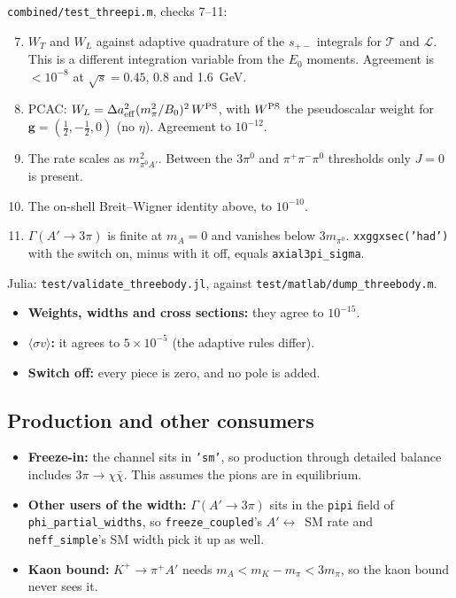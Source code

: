 \documentclass{article}
\newcommand{\spm}{s_{+-}}
\newcommand{\mpi}{m_\pi}
\newcommand{\Da}{\Delta a}
\begin{document}
\texttt{combined/test\_threepi.m}, checks 7--11:
\begin{enumerate}
\setcounter{enumi}{6}
\item $W_T$ and $W_L$ against adaptive quadrature of the $\spm$ integrals for $\mathcal T$ and
  $\mathcal L$. This is a different integration variable from the $E_0$ moments. Agreement is
  $<10^{-8}$ at $\sqrt s=0.45$, 0.8 and 1.6~GeV.
\item PCAC: $W_L=\Da_{\rm eff}^2(\mpi^2/B_0)^2\,W^{\rm PS}$, with $W^{\rm PS}$ the pseudoscalar
  weight for $\mathbf g=(\tfrac12,-\tfrac12,0)$ (no $\eta$). Agreement to $10^{-12}$.
\item The rate scales as $m_{\pi^0A'}^2$. Between the $3\pi^0$ and $\pi^+\pi^-\pi^0$ thresholds
  only $J=0$ is present.
\item The on-shell Breit--Wigner identity above, to $10^{-10}$.
\item $\Gamma(A'\to3\pi)$ is finite at $m_A=0$ and vanishes below $3m_{\pi^0}$.
  \texttt{xxggxsec('had')} with the switch on, minus with it off, equals \texttt{axial3pi\_sigma}.
\end{enumerate}
Julia: \texttt{test/validate\_threebody.jl}, against \texttt{test/matlab/dump\_threebody.m}.
\begin{itemize}
\item \textbf{Weights, widths and cross sections:} they agree to $10^{-15}$.
\item \textbf{$\langle\sigma v\rangle$:} it agrees to $5\times10^{-5}$ (the adaptive rules differ).
\item \textbf{Switch off:} every piece is zero, and no pole is added.
\end{itemize}

\subsection{Production and other consumers}

\begin{itemize}
\item \textbf{Freeze-in:} the channel sits in \texttt{'sm'}, so production through detailed
  balance includes $3\pi\to\chi\bar\chi$. This assumes the pions are in equilibrium.
\item \textbf{Other users of the width:} $\Gamma(A'\to3\pi)$ sits in the \texttt{pipi} field of
  \texttt{phi\_partial\_widths}, so \texttt{freeze\_coupled}'s $A'\leftrightarrow$~SM rate and
  \texttt{neff\_simple}'s SM width pick it up as well.
\item \textbf{Kaon bound:} $K^+\to\pi^+A'$ needs $m_A<m_K-m_\pi<3m_\pi$, so the kaon bound never
  sees it.
\end{itemize}
\end{document}

